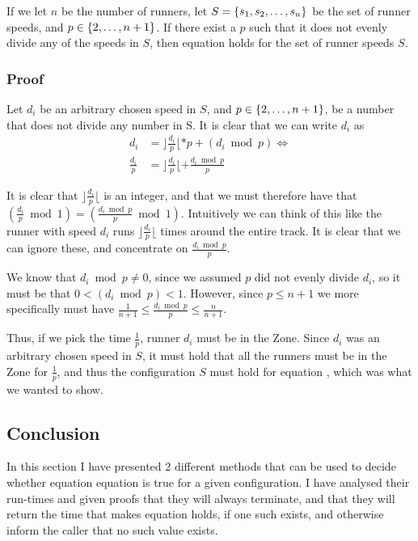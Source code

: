If we let $n$ be the number of runners, let $S = \{s_1, s_2, \ldots, s_n\}$ be the set of runner speeds, and $p \in \{2, \ldots, n+1\}$. If there exist a $p$ such that it does not evenly divide any of the speeds in $S$, then equation  holds for the set of runner speeds $S$.

\subsubsection{Proof}
Let $d_i$ be an arbitrary chosen speed in $S$, and $p \in \{2, \ldots, n+1\}$, be a number that does not divide any number in S. It is clear that we can write $d_i$ as
\begin{equation}
\begin{split}
d_i &= \rfloor\frac{d_i}{p}\lfloor * p + (d_i \bmod p) \Leftrightarrow\\
\frac{d_i}{p} &= \rfloor\frac{d_i}{p}\lfloor + \frac{d_i \bmod p}{p}
\end{split}
\end{equation}

It is clear that $\rfloor\frac{d_i}{p}\lfloor$ is an integer, and that we must therefore have that $(\frac{d_i}{p} \bmod 1) = (\frac{d_i \bmod p}{p} \bmod 1)$. Intuitively we can think of this like the runner with speed $d_i$ runs $\rfloor \frac{d_i}{p}\lfloor$ times around the entire track. It is clear that we can ignore these, and concentrate on $\frac{d_i \bmod p}{p}$. 

We know that $d_i \bmod p \neq 0$, since we assumed $p$ did not evenly divide $d_i$, so it must be that $0 < (d_i \bmod p) < 1$. However, since $p \leq n+1$ we more specifically must have $\frac{1}{n+1} \leq \frac{d_i \bmod p}{p} \leq \frac{n}{n+1}$.

Thus, if we pick the time $\frac{1}{p}$, runner $d_i$ must be in the Zone. Since $d_i$ was an arbitrary chosen speed in $S$, it must hold that all the runners must be in the Zone for $\frac{1}{p}$, and thus the configuration $S$ must hold for equation , which was what we wanted to show.


\subsection{Conclusion}
In this section I have presented 2 different methods that can be used to decide whether equation equation  is true for a given configuration. I have analysed their run-times and given proofs that they will always terminate, and that they will return the time that makes equation  holds, if one such exists, and otherwise inform the caller that no such value exists.
